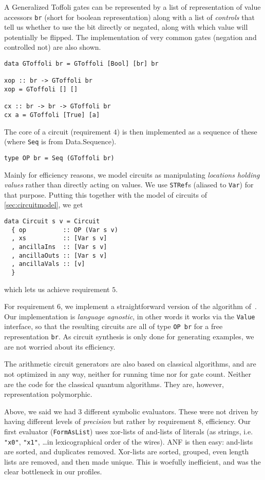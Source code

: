 \documentclass[sigplan,review]{acmart}
\begin{document}
A Generalized Toffoli gates can be represented by a list of representation of
value accessors \texttt{br} (short for boolean representation) along with a list
of \emph{controls} that tell us whether to use the bit directly or negated,
along with which value will potentially be flipped. The implementation of very 
common gates (negation and controlled not) are also shown.
\begin{verbatim}
data GToffoli br = GToffoli [Bool] [br] br

xop :: br -> GToffoli br
xop = GToffoli [] []

cx :: br -> br -> GToffoli br
cx a = GToffoli [True] [a]
\end{verbatim}
\noindent The core of a circuit (requirement $4$) is then implemented as a 
sequence of these (where \texttt{Seq} is from {Data.Sequence}).
\begin{verbatim}
type OP br = Seq (GToffoli br)
\end{verbatim}

\noindent Mainly for efficiency reasons, we model circuits as manipulating
\emph{locations holding values} rather than directly acting on values. We
use \texttt{STRef}s (aliased to \texttt{Var}) for that purpose. Putting this
together with the model of circuits of \ref{sec:circuitmodel}, we get
\begin{verbatim}
data Circuit s v = Circuit
  { op          :: OP (Var s v)
  , xs          :: [Var s v]
  , ancillaIns  :: [Var s v]
  , ancillaOuts :: [Var s v]  
  , ancillaVals :: [v]
  }
\end{verbatim}
\noindent which lets us achieve requirement $5$.

For requirement $6$, we implement a straightforward version of 
the algorithm of~\cite{SoekenEtAl2016}. Our implementation is
\emph{language agnostic}, in other words it works via the \texttt{Value}
interface, so that the resulting circuits are all of type \texttt{OP br}
for a free representation \texttt{br}. As circuit synthesis is only
done for generating examples, we are not worried about its efficiency.

The arithmetic circuit generators are also based on classical algorithms, and are
not optimized in any way, neither for running time nor for gate count. Neither are
the code for the classical quantum algorithms. They are, however, representation
polymorphic.

Above, we said we had $3$ different symbolic evaluators. These were not driven
by having different levels of \emph{precision} but rather by requirement $8$,
efficiency. Our first evaluator (\texttt{FormAsList}) uses xor-lists of
and-lists of literals (as strings, i.e.
\texttt{"x0"}, \texttt{"x1"}, \ldots in lexicographical order of the wires). ANF 
is then easy: and-lists are sorted, and duplicates removed. Xor-lists are sorted,
grouped, even length lists are removed, and then made unique. This is woefully
inefficient, and was the clear bottleneck in our profiles.
\end{document}
